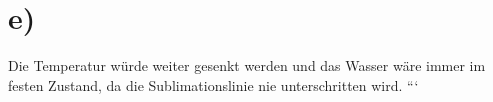 

\section*{e)}
Die Temperatur würde weiter gesenkt werden und das Wasser wäre immer im festen Zustand, da die Sublimationslinie nie unterschritten wird.
```